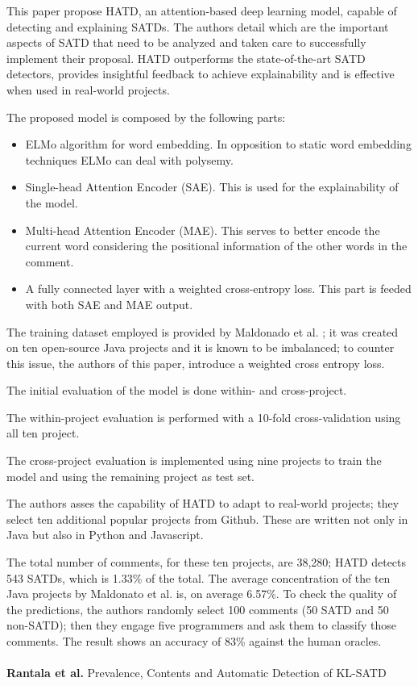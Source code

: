 This paper propose HATD, an attention-based deep learning model, capable of detecting and explaining SATDs. The authors detail which are the important aspects of SATD that need to be analyzed and taken care to successfully implement their proposal. HATD outperforms the state-of-the-art SATD detectors, provides insightful feedback to achieve explainability and is effective when used in real-world projects.

The proposed model is composed by the following parts:
\begin{itemize}
    \item ELMo algorithm for word embedding. In opposition to static word embedding techniques ELMo can deal with polysemy.
    \item Single-head Attention Encoder (SAE). This is used for the explainability of the model.
    \item Multi-head Attention Encoder (MAE). This serves to better encode the current word considering the positional information of the other words in the comment.
    \item A fully connected layer with a weighted cross-entropy loss. This part is feeded with both SAE and MAE output. 
\end{itemize}

The training dataset employed is provided by Maldonado et al. \cite{maldonado2017using}; it was created on ten open-source Java projects and it is known to be imbalanced; to counter this issue, the authors of this paper, introduce a weighted cross entropy loss. 

The initial evaluation of the model is done within- and cross-project.

The within-project evaluation is performed with a 10-fold cross-validation using all ten project.

The cross-project evaluation is implemented using nine projects to train the model and using the remaining project as test set.


The authors asses the capability of HATD to adapt to real-world projects; they select ten additional popular projects from Github. These are written not only in Java but also in Python and Javascript. 

The total number of comments, for these ten projects, are 38,280; HATD detects 543 SATDs, which is 1.33\% of the total. The average concentration of the ten Java projects by Maldonato et al. is, on average 6.57\%.
To check the quality of the predictions, the authors randomly select 100 comments (50 SATD and 50 non-SATD); then they engage five programmers and ask them to classify those comments. The result shows an accuracy of 83\% against the human oracles.
\\
\\
\textbf{Rantala et al.} \cite{rantala2020prevalence} Prevalence, Contents and Automatic Detection of KL-SATD

